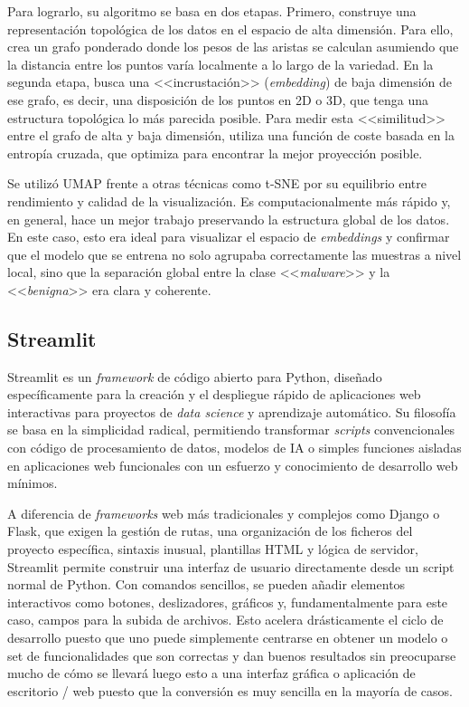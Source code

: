 Para lograrlo, su algoritmo se basa en dos etapas. Primero, construye una representación topológica de los datos en el espacio de alta dimensión. Para ello, crea un grafo ponderado donde los pesos de las aristas se calculan asumiendo que la distancia entre los puntos varía localmente a lo largo de la variedad. En la segunda etapa, busca una <<incrustación>> (\textit{embedding}) de baja dimensión de ese grafo, es decir, una disposición de los puntos en 2D o 3D, que tenga una estructura topológica lo más parecida posible. Para medir esta <<similitud>> entre el grafo de alta y baja dimensión, utiliza una función de coste basada en la entropía cruzada, que optimiza para encontrar la mejor proyección posible.

Se utilizó UMAP frente a otras técnicas como t-SNE por su equilibrio entre rendimiento y calidad de la visualización. Es computacionalmente más rápido y, en general, hace un mejor trabajo preservando la estructura global de los datos. En este caso, esto era ideal para visualizar el espacio de \textit{embeddings} y confirmar que el modelo que se entrena no solo agrupaba correctamente las muestras a nivel local, sino que la separación global entre la clase <<\textit{malware}>> y la <<\textit{benigna}>> era clara y coherente.

\subsection{Streamlit}


Streamlit es un \textit{framework} de código abierto para Python, diseñado específicamente para la creación y el despliegue rápido de aplicaciones web interactivas para proyectos de \textit{data science} y aprendizaje automático. Su filosofía se basa en la simplicidad radical, permitiendo transformar \textit{scripts} convencionales con código de procesamiento de datos, modelos de IA o simples funciones aisladas en aplicaciones web funcionales con un esfuerzo y conocimiento de desarrollo web mínimos.

A diferencia de \textit{frameworks} web más tradicionales y complejos como Django o Flask, que exigen la gestión de rutas, una organización de los ficheros del proyecto específica, sintaxis inusual, plantillas HTML y lógica de servidor, Streamlit permite construir una interfaz de usuario directamente desde un script normal de Python. Con comandos sencillos, se pueden añadir elementos interactivos como botones, deslizadores, gráficos y, fundamentalmente para este caso, campos para la subida de archivos. Esto acelera drásticamente el ciclo de desarrollo puesto que uno puede simplemente centrarse en obtener un modelo o set de funcionalidades que son correctas y dan buenos resultados sin preocuparse mucho de cómo se llevará luego esto a una interfaz gráfica o aplicación de escritorio / web puesto que la conversión es muy sencilla en la mayoría de casos.

